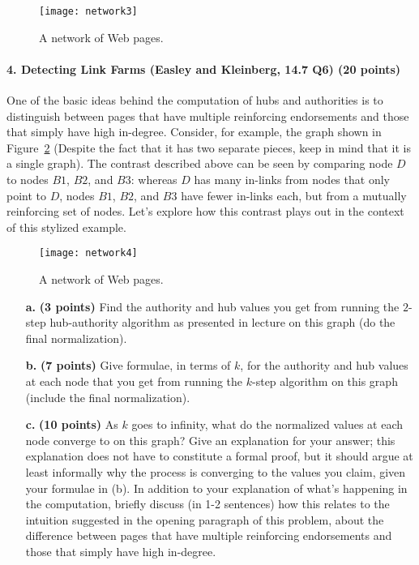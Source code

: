 \documentclass[11pt]{article}
\begin{document}
\begin{figure}
\centering
\texttt{[image: network3]}
\caption{A network of Web pages.}
\label{network3}
\end{figure}

\paragraph{4. Detecting Link Farms (Easley and Kleinberg, 14.7 Q6) (20 points)}
One of the basic ideas behind the computation of hubs and authorities is to distinguish between pages that have multiple reinforcing endorsements and those that simply have high in-degree. Consider, for example, the graph shown in Figure~\ref{network4} (Despite the fact that it has two separate pieces, keep in mind that it is a single graph). The contrast described above can be seen by comparing node $D$ to nodes $B1$, $B2$, and $B3$: whereas $D$ has many in-links from nodes that only point to $D$, nodes $B1$, $B2$, and $B3$ have fewer in-links each, but from a mutually reinforcing set of nodes. Let's explore how this contrast plays out in the context of this stylized example.\\
\begin{figure}
\centering
\texttt{[image: network4]}
\caption{A network of Web pages.}
\label{network4}
\end{figure}
\begin{itemize}
\item[\textbf{a. }] \textbf{(3 points)} Find the authority and hub values you get from running the $2$-step hub-authority algorithm as presented in lecture on this graph (do the final normalization).
\item[\textbf{b. }] \textbf{(7 points)} Give formulae, in terms of $k$, for the authority and hub values at each node that you get from running the $k$-step algorithm on this graph (include the final normalization).
\item[\textbf{c. }] \textbf{(10 points)} As $k$ goes to infinity, what do the normalized values at each node converge to on this graph? Give an explanation for your answer; this explanation does not have to constitute a formal proof, but it should argue at least informally why the process is converging to the values you claim, given your formulae in (b). In addition to your explanation of what's happening in the computation, briefly discuss (in 1-2 sentences) how this relates to the intuition suggested in the opening paragraph of this problem, about the difference between pages that have multiple reinforcing endorsements and those that simply have high in-degree.
\end{itemize}
\end{document}
